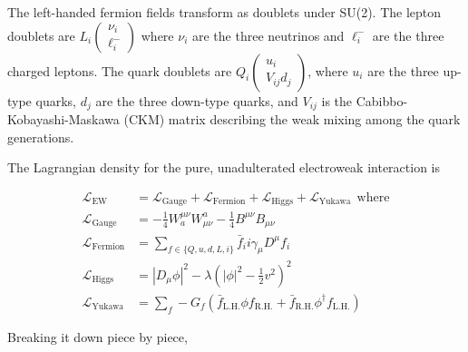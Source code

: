 The left-handed fermion fields transform as doublets under SU(2).
The lepton doublets are $L_i \begin{pmatrix}\nu_i \\ \ell_i^{-} \end{pmatrix}$ where $\nu_i$ are the three neutrinos and $\ell_i^{-}$ are the three charged leptons.
The quark doublets are $Q_i \begin{pmatrix} u_i \\ V_{ij} d_j \end{pmatrix}$, 
where $u_i$ are the three up-type quarks, $d_j$ are the three down-type quarks,
and $V_{ij}$ is the Cabibbo-Kobayashi-Maskawa (CKM) matrix describing the weak mixing among the quark generations.

The Lagrangian density for the pure, unadulterated electroweak interaction is

\begin{equation}
\begin{split}
\label{eq:EWpreSSB}
\mathcal{L}_\mathrm{EW} & = \mathcal{L}_\mathrm{Gauge} + \mathcal{L}_\mathrm{Fermion} + \mathcal{L}_\mathrm{Higgs} + \mathcal{L}_\mathrm{Yukawa} \:\:\mathrm{where} \\
\mathcal{L}_\mathrm{Gauge}   & = -\frac{1}{4}W^{\mu\nu}_a W^a_{\mu\nu} - \frac{1}{4} B^{\mu\nu} B_{\mu\nu} \\
\mathcal{L}_\mathrm{Fermion} & = \sum_{f \in \{Q,u,d,L,i\}} \bar{f}_i i \gamma_\mu D^\mu f_i \\ 
\mathcal{L}_\mathrm{Higgs}   & = |D_\mu \phi|^2 - \lambda \left( |\phi|^2 - \frac{1}{2} v^2 \right)^2 \\
\mathcal{L}_\mathrm{Yukawa}  & = \sum_f -G_f (\bar{f}_\mathrm{L.H.} \phi f_\mathrm{R.H.} + \bar{f}_\mathrm{R.H.} \phi^\dagger f_\mathrm{L.H.} )
\end{split}
\end{equation}

Breaking it down piece by piece, 

